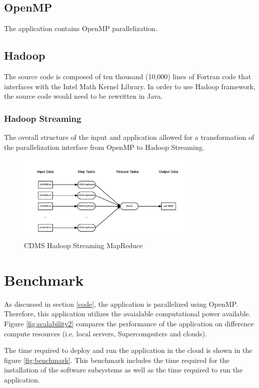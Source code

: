 \documentclass[9pt,twocolumn,twoside]{../../styles/osajnl}
\begin{document}
\subsection{OpenMP}
The application contains OpenMP parallelization.
\subsection{Hadoop}
The source code is composed of ten thousand (10,000) lines of Fortran
code that interfaces with the Intel Math Kernel Library. In order to
use Hadoop framework, the source code would need to be rewritten in
Java. 
\subsubsection{Hadoop Streaming}
The overall structure of the input and application allowed for a
transformation of the parallelization interface from OpenMP to Hadoop
Streaming.
\begin{figure}
\centering
\includegraphics[height=1.65in, width=\columnwidth]{images/mapreduce}
\caption{CDMS Hadoop Streaming MapReduce}
\end{figure}

\section{Benchmark} \label{benchmark-sect}
As discussed in section \ref{code}, the application is parallelized
using OpenMP. Therefore, this application utilizes the avaialable
computational power available. Figure \ref{fig:scalability2} compares
the performance of the application on difference compute resources
(i.e. local servers, Supercomputers and clouds).

The time required to deploy and run the application in the cloud is
shown in the figure \ref{fig:benchmark}. This benchmark includes the
time required for the installation of the software subsystems as well
as the time required to run the application.
\end{document}
